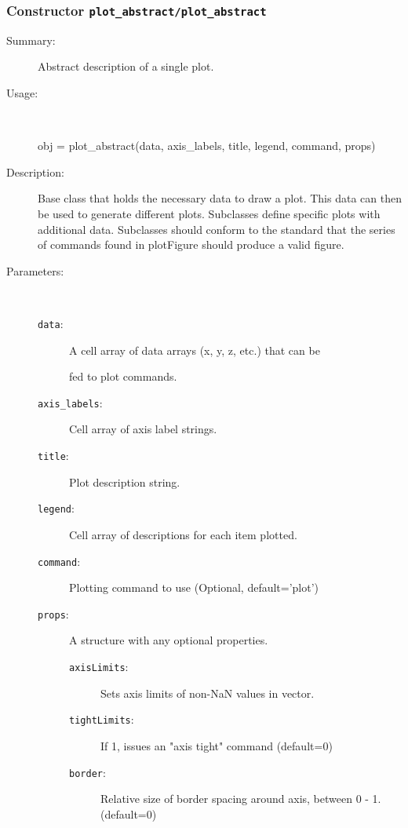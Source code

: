 \subsubsection[Constructor \texttt{plot\_abstract}]{Constructor \texttt{plot\_abstract/plot\_abstract}}%
%
\label{ref_plot_abstract__plot_abstract}%
\hypertarget{ref_plot_abstract__plot_abstract}{}%
\begin{description}
\item[Summary:]Abstract description of a single plot.
%
\item[Usage:]~%
\begin{lyxcode}%
obj = plot\_abstract(data, axis\_labels, title, legend, command, props)
%
\end{lyxcode}%
%
\item[Description:]%
Base class that holds the necessary data to draw a plot. This data
 can then be used to generate different plots. Subclasses define specific
 plots with additional data. Subclasses should conform to the standard 
 that the series of commands found in plotFigure should produce a valid
 figure.
\item[Parameters:]~
\begin{description}%
\item[\texttt{data}:]
 A cell array of data arrays (x, y, z, etc.) that can be 

fed to plot commands.\item[\texttt{axis\_labels}:]
 Cell array of axis label strings.
\item[\texttt{title}:]
 Plot description string.
\item[\texttt{legend}:]
 Cell array of descriptions for each item plotted.
\item[\texttt{command}:]
 Plotting command to use (Optional, default='plot')
\item[\texttt{props}:]
 A structure with any optional properties.
\begin{description}%
\item[\texttt{axisLimits}:]
 Sets axis limits of non-NaN values in vector.
\item[\texttt{tightLimits}:]
 If 1, issues an "axis tight" command (default=0)
\item[\texttt{border}:]
 Relative size of border spacing around axis, between 0 - 1. (default=0)


\end{description}
\end{description}
\end{description}
